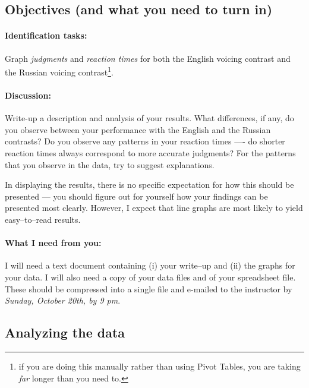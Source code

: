 \documentclass{article}
\begin{document}
\subsection{Objectives (and what you need to turn in)}

\paragraph{Identification tasks:} Graph \emph{judgments} and \emph{reaction times} for both the English voicing contrast and the Russian voicing contrast\footnote{if you are doing this manually rather than using Pivot Tables, you are taking \emph{far} longer than you need to.}.

\paragraph{Discussion:} Write-up a description and analysis of your results. What differences, if any, do you observe between your performance with the English and the Russian contrasts? Do you observe any patterns in your reaction times ---- do shorter reaction times always correspond to more accurate judgments? For the patterns that you observe in the data, try to suggest explanations.

In displaying the results, there is no specific expectation for how this should be presented --- you should figure out for yourself how your findings can be presented most clearly. However, I expect that line graphs are most likely to yield easy--to--read results.

\paragraph{What I need from you:} I will need a text document containing (i) your write--up and (ii) the graphs for your data. I will also need a copy of your data files and of your spreadsheet file. These should be compressed into a single file and e-mailed to the instructor by \emph{Sunday, October 20th, by 9 pm}.


\subsection{Analyzing the data}
\end{document}
